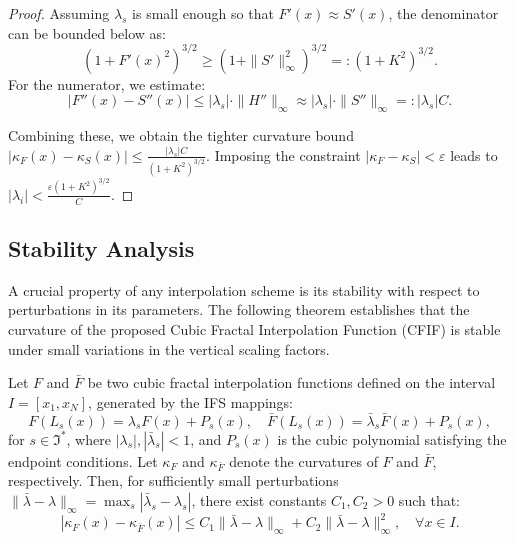 \documentclass[runningheads]{llncs}
\begin{document}
\begin{proof}
		Assuming $ \lambda_s $ is small enough so that $ F'(x) \approx S'(x) $, the denominator can be bounded below as:
		$$ (1 + F'(x)^2)^{3/2} \geq (1 + \|S'\|_\infty^2)^{3/2} =: (1 + K^2)^{3/2}. $$
		For the numerator, we estimate: $$ |F''(x) - S''(x)| \leq |\lambda_s| \cdot \|H''\|_\infty \approx |\lambda_s| \cdot \|S''\|_\infty =: |\lambda_s| C.$$
		
		Combining these, we obtain the tighter curvature bound $ |\kappa_F(x) - \kappa_S(x)| \leq \frac{|\lambda_s| C}{(1 + K^2)^{3/2}}$. Imposing the constraint $ |\kappa_F - \kappa_S| < \varepsilon $ leads to $ |\lambda_i| < \frac{\varepsilon (1 + K^2)^{3/2}}{C}$.
	\end{proof}
	
	\subsection{Stability Analysis}
	
	A crucial property of any interpolation scheme is its stability with respect to perturbations in its parameters. The following theorem establishes that the curvature of the proposed Cubic Fractal Interpolation Function (CFIF) is stable under small variations in the vertical scaling factors.
	
	\begin{theorem}
		Let \( F \) and \( \bar{F} \) be two cubic fractal interpolation functions defined on the interval \( I = [x_1, x_N] \), generated by the IFS mappings:
		\[
		F(L_s(x)) = \lambda_s F(x) + P_s(x), \quad \bar{F}(L_s(x)) = \bar{\lambda}_s \bar{F}(x) + P_s(x),
		\]
		for \( s \in \Im^* \), where \( |\lambda_s|, |\bar{\lambda}_s| < 1 \), and \( P_s(x) \) is the cubic polynomial satisfying the endpoint conditions. Let \( \kappa_F \) and \( \kappa_{\bar{F}} \) denote the curvatures of \( F \) and \( \bar{F} \), respectively. Then, for sufficiently small perturbations \( \|\bar{\lambda} - \lambda\|_\infty = \max_s |\bar{\lambda}_s - \lambda_s| \), there exist constants \( C_1, C_2 > 0 \) such that:
		\[
		|\kappa_F(x) - \kappa_{\bar{F}}(x)| \leq C_1 \|\bar{\lambda} - \lambda\|_\infty + C_2 \|\bar{\lambda} - \lambda\|_\infty^2, \quad \forall x \in I.
		\]
	\end{theorem}
	
\end{document}
